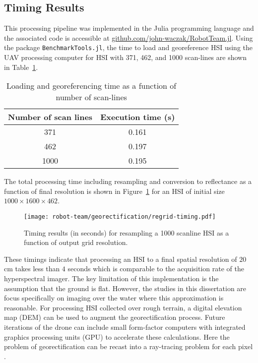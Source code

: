 \subsection{Timing Results}

This processing pipeline was implemented in the Julia programming language and
the associated code is accessible at \url{github.com/john-waczak/RobotTeam.jl}.
Using the package \texttt{BenchmarkTools.jl}, the time to load and georeference
HSI using the UAV processing computer for HSI with 371, 462, and 1000 scan-lines are
shown in Table~\ref{tab:georeference-times}.

\begin{table}[!hbt]
  \caption{Loading and georeferencing time as a function of number of scan-lines}
  \label{tab:georeference-times}
  \centering
  \begin{tabular}{cc}
    \hline
    \textbf{Number of scan lines}	& \textbf{Execution time (s)}\\
    \hline
    371		  &   0.161	\\
    462     &   0.197	\\
    1000    &   0.195  \\
    \hline
  \end{tabular}
\end{table}

The total processing time including resampling and conversion to reflectance as a
function of final resolution is shown in Figure~\ref{fig:regridding-timing} for
an HSI of initial size $1000\times 1600 \times 462$.

\begin{figure}[!hbt]
  \texttt{[image: robot-team/georectification/regrid-timing.pdf]}
  \caption{Timing results (in seconds) for resampling a 1000 scanline HSI as a function of output grid resolution.}
  \label{fig:regridding-timing}
\end{figure}

These timings indicate that processing an HSI to a final spatial resolution of
$20$ cm takes less than $4$ seconds which is comparable to the acquisition rate
of the hyperspectral imager. The key limitation of this implementation is the
assumption that the ground is flat. However, the studies in this dissertation
are focus specifically on imaging over the water where this approximation is
reasonable. For processing HSI collected over rough terrain, a digital elevation
map (DEM) can be used to augment the georectification process. Future iterations
of the drone can include small form-factor computers with integrated graphics
processing units (GPU) to accelerate these calculations. Here the problem of
georectification can be recast into a ray-tracing problem for each pixel
\cite{gpu-georect}.
